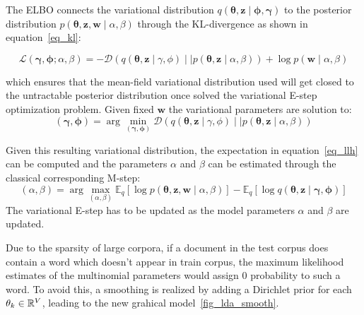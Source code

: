 \documentclass[12pt,a4paper,onecolumn]{article}
\begin{document}
The ELBO connects the variational distribution \(q(\bm{\theta}, \bm{z} \mid \bm{\phi}, \bm{\gamma})\) to the posterior distribution \(p(\bm{\theta}, \bm{z}, \bm{w} \mid \alpha, \beta)\) through the KL-divergence as shown in equation~\eqref{eq_kl}:

\begin{equation}
	\mathcal{L}(\bm{\gamma}, \bm{\phi} ; \alpha, \beta) = -\mathcal{D}(q(\bm{\theta}, \bm{z} \mid \gamma, \phi)\mid\mid p(\bm{\theta}, \bm{z} \mid \alpha, \beta)) + \log p(\bm{w} \mid \alpha, \beta)
	\label{eq_kl}
\end{equation}

which ensures that the mean-field variational distribution used will get closed to the untractable posterior distribution once solved the variational E-step optimization problem. Given fixed \(\bm{w}\) the variational parameters are solution to:
\begin{equation*}
	(\bm{\gamma}, \bm{\phi}) = \operatorname{arg}\min_{(\bm{\gamma}, \bm{\phi})} \mathcal{D}(q(\bm{\theta}, \bm{z} \mid \gamma, \phi)\mid\mid p(\bm{\theta}, \bm{z} \mid \alpha, \beta)) \tag{variational E-step}
\end{equation*}

Given this resulting variational distribution, the expectation in  equation~\eqref{eq_llh} can be computed and the parameters \(\alpha\) and \(\beta\) can be estimated through the classical corresponding M-step:
\begin{equation*}
	(\alpha, \beta) = \operatorname{arg}\max_{(\alpha, \beta)} \mathbb{E}_{q}\left[\log p(\bm{\theta},\bm{z}, \bm{w} \mid \alpha, \beta)\right] - \mathbb{E}_{q}\left[\log q(\bm{\theta}, \bm{z} \mid \bm{\gamma}, \bm{\phi})\right] \tag{M-step}
\end{equation*}
The variational E-step has to be updated as the model parameters \(\alpha\) and \(\beta\) are updated.


Due to the sparsity of large corpora, if a document in the test corpus does contain a word which doesn't appear in train corpus, the maximum likelihood estimates of the multinomial parameters would assign 0 probability to such a word. To avoid this, a smoothing is realized by adding a Dirichlet prior for each \(\theta_{k} \in \mathbb{R}^V\), leading to the new grahical model~\ref{fig_lda_smooth}.
\end{document}

